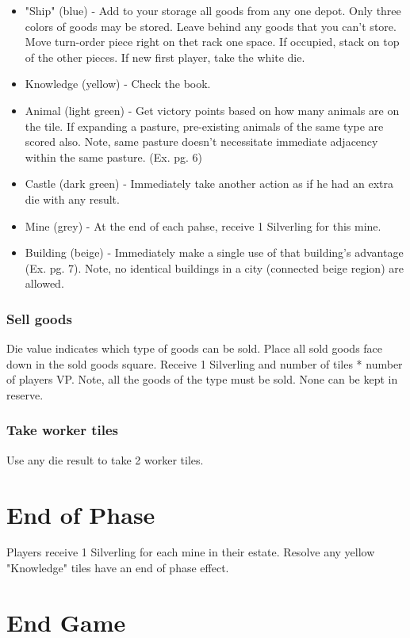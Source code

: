 \documentclass[12pt]{article}
\newenvironment{itemizeCustom}
{\begin{itemize}
  \setlength{\itemsep}{1pt}
  \setlength{\parskip}{0pt}
  \setlength{\parsep}{0pt}}
{\end{itemize}}
\begin{document}
\begin{multicols*}{2}
\begin{itemizeCustom}
	\item "Ship" (blue) - Add to your storage all goods from any one depot. Only three colors of goods may be stored. Leave behind any goods that you can't store. Move turn-order piece right on thet rack one space. If occupied, stack on top of the other pieces. If new first player, take the white die.
	\item Knowledge (yellow) - Check the book.
	\item Animal (light green) - Get victory points based on how many animals are on the tile. If expanding a pasture, pre-existing animals of the same type are scored also. Note, same pasture doesn't necessitate immediate adjacency within the same pasture. (Ex. pg. 6)
	\item Castle (dark green) - Immediately take another action as if he had an extra die with any result.
	\item Mine (grey) - At the end of each pahse, receive 1 Silverling for this mine.
	\item Building (beige) - Immediately make a single use of that building's advantage (Ex. pg. 7). Note, no identical buildings in a city (connected beige region) are allowed.
\end{itemizeCustom}

\subsubsection*{Sell goods}
Die value indicates which type of goods can be sold. Place all sold goods face down in the sold goods square. Receive 1 Silverling and number of tiles * number of players VP. Note, all the goods of the type must be sold. None can be kept in reserve.

\subsubsection*{Take worker tiles}
Use any die result to take 2 worker tiles.

\section*{End of Phase}
Players receive 1 Silverling for each mine in their estate. Resolve any yellow "Knowledge" tiles have an end of phase effect.

\section*{End Game}

\end{multicols*}
\end{document}
